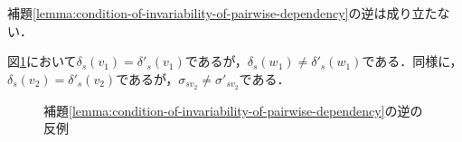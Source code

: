 補題\ref{lemma:condition-of-invariability-of-pairwise-dependency}の逆は成り立たない．

\begin{example}
  \label{ex:counter-of-invariability-of-pairwise-dependency}
  図\ref{fig:pd-invariability-counterexample}において$\delta_s(v_1)=\delta'_s(v_1)$であるが，$\delta_s(w_1)\neq\delta'_s(w_1)$である．同様に，$\delta_s(v_2)=\delta'_s(v_2)$であるが，$\sigma_{sv_2}\neq\sigma'_{sv_2}$である．

  \begin{figure}[tb]
    \centering
    \def\svgwidth{.45\linewidth}
    
    \caption{補題\ref{lemma:condition-of-invariability-of-pairwise-dependency}の逆の反例}
    \label{fig:pd-invariability-counterexample}
  \end{figure}
\end{example}


